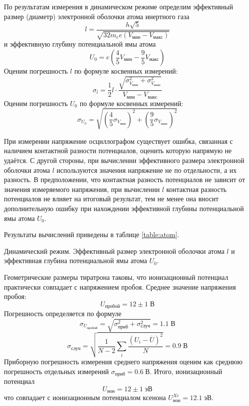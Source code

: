 \documentclass[10pt,a4paper]{article}
\newcommand{\V}{\; В}
\begin{document}
	По результатам измерения в динамическом режиме определим эффективный размер (диаметр) электронной оболочки атома инертного газа
	$$
	l = \frac{h\sqrt{5}}{\sqrt{32 m_e e (V_{мин} - V_{макс})}}
	$$
	и эффективную глубину потенциальной ямы атома
	$$
	U_0 = e \left(\frac{4}{5} V_{мин} - \frac{9}{5} V_{макс} \right)
	$$
	Оценим погрешность $l$ по формуле косвенных измерений:
	$$
	\sigma_l = \frac{1}{2} l \cdot \frac{\sqrt{\sigma_{V_{мин}}^2 + \sigma_{V_{макс}}^2}}{V_{мин} - V_{макс}}
	$$
	Оценим погрешность $U_0$ по формуле косвенных измерений:
	$$
	\sigma_{U_0} = \sqrt{\left(\frac{4}{5} \sigma_{V_{мин}}\right)^2 + \left(\frac{9}{5} \sigma_{V_{макс}}\right)^2}
	$$
	
	При измерении напряжение осциллографом существует ошибка, связанная с наличием контактной разности потенциалов, оценить которую напрямую не удаётся. С другой стороны, при вычислении эффективного размера электронной оболочки атома $l$ используются значения напряжение не по отдельности, а их разность. В предположении, что контактная разность потенциалов не зависит от значения измеряемого напряжения, при вычислении $l$ контактная разность потенциалов не влияет на итоговый результат, тем не менее она вносит дополнительную ошибку при нахождении эффективной глубины потенциальной ямы атома $U_0$.
	
	Результаты вычислений приведены в таблице \ref{table:atom}.
	
	\begin{table}[H]
		\caption{Динамический режим. Эффективный размер электронной оболочки атома $l$ и эффективная глубина потенциальной ямы атома $U_0$.}
		\label{table:atom}
		\begin{center}
			
		\end{center}
	\end{table}

	Геометрические размеры тиратрона таковы, что ионизационный потенциал практически совпадает с напряжением пробоя. Среднее значение напряжения пробоя: \\
	$$
	U_{пробой} = 12 \pm 1 \V
	$$
	Погрешность определяется по формуле
	$$
	\sigma_{U_{пробой}} = \sqrt{\sigma_{приб}^2 + \sigma_{случ}^2} = 1.1 \V
	$$
	$$
	\sigma_{случ} = \sqrt{\frac{1}{N - 2}\sum_i \frac{\left(U_i - \overline{U}\right)^2}{N}} = 0.9 \V
	$$
	Приборную погрешность измерения среднего напряжения оценим как среднюю погрешность отдельных измерений $\sigma_{приб} = 0.6 \V$.
	Итого, ионизационный потенциал
	$$
	U_{ион} = 12 \pm 1 \; эВ
	$$
	что совпадает с ионизационным потенциалом ксенона $U_{ион}^{Xe} = 12.1 \; эВ$.
	
\end{document}
